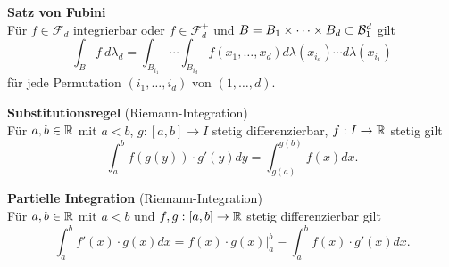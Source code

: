 \textbf{Satz von Fubini}\\
Für $f\in\mathcal{F}_d$ integrierbar oder $f\in\mathcal{F}_d^+$ und
$B = B_1\times\cdots\times B_d\subset\mathcal{B}_{1}^d$ gilt
\[
	\int_B f~d\lambda_d=\int_{B_{i_1}}\cdots\int_{B_{i_d}} f(x_1,\ldots,x_d)
	d\lambda(x_{i_d})\cdots d\lambda(x_{i_1})
\]
für jede Permutation $(i_1,\ldots,i_d)$ von $(1,\ldots,d)$.

\textbf{Substitutionsregel} (Riemann-Integration)\\
Für $a,b\in\mathbb{R}$ mit $a<b$, $g:[a,b]\to I$ stetig differenzierbar, $f:I\to\mathbb{R}$ stetig
gilt
\[
	\int_a^b f(g(y))\cdot g'(y)dy=\int_{g(a)}^{g(b)}f(x)dx.
\]

\textbf{Partielle Integration} (Riemann-Integration)\\
Für $a,b\in\mathbb{R}$ mit $a<b$ und $f,g:[a,b]\to\mathbb{R}$ stetig differenzierbar gilt
\[
	\int_a^b f'(x)\cdot g(x)dx 
	= f(x)\cdot g(x)\Big\vert_a^b-\int_a^b f(x)\cdot g'(x)dx.
\]
